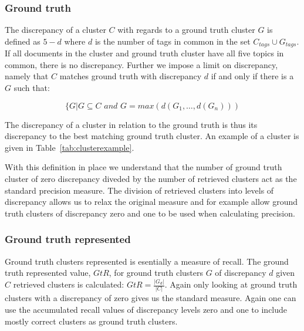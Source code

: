 \subsubsection{Ground truth}

The discrepancy of a cluster \(C\) with regards to a ground truth cluster \(G\) is defined as \(5 - d\) where \(d\) is the number of tags in common in the set \(C_{tags} \cup G_{tags}\). If all documents in the cluster and ground truth cluster have all five topics in common, there is no discrepancy. Further we impose a limit on discrepancy, namely that \(C\) matches ground truth with discrepancy \(d\) if and only if there is a \(G\) such that:

\begin{displaymath}
\{ G \vert G \subseteq C \textit{ and } G = max(d(G_{1}, \dots, d(G_{n})))
\end{displaymath}

The discrepancy of a cluster in relation to the ground truth is thus its discrepancy to the best matching ground truth cluster. An example of a cluster is given in Table~\ref{tab:clusterexample}.

With this definition in place we understand that the number of ground truth cluster of zero discrepancy diveded by the number of retrieved clusters act as the standard precision measure. The division of retrieved clusters into levels of discrepancy allows us to relax the original measure and for example allow ground truth clusters of discrepancy zero and one to be used when calculating precision.

\subsubsection{Ground truth represented}

Ground truth clusters represented is esentially a measure of recall. The ground truth represented value, \(GtR\), for ground truth clusters \(G\) of discrepancy \(d\) given \(C\) retrieved clusters is calculated: \(GtR = \frac{\vert G_{d} \vert}{\vert C \vert}\). Again only looking at ground truth clusters with a discrepancy of zero gives us the standard measure. Again one can use the accumulated recall values of discrepancy levels zero and one to include mostly correct clusters as ground truth clusters.

